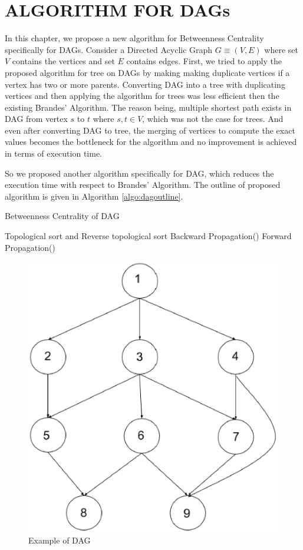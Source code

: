 \chapter{ALGORITHM FOR DAGs}
\label{chap:sup}
 
In this chapter, we propose a new algorithm for Betweenness Centrality specifically for DAGs. 
Consider a Directed Acyclic Graph $G \equiv (V,E)$ where set $V$ contains the vertices and set $E$ contains edges. 
First, we tried to apply the proposed algorithm for tree on DAGs by making making duplicate vertices if a vertex has two or more parents. Converting DAG into a tree with duplicating vertices and then applying the algorithm for trees was less efficient then the existing Brandes' Algorithm. The reason being, multiple shortest path exists in DAG from vertex $s$ to $t$ where $s, t \in V$, which was not the case for trees. And even after converting DAG to tree, the merging of vertices to compute the exact values becomes the bottleneck for the algorithm and no improvement is achieved in terms of execution time.   

So we proposed another algorithm specifically for DAG, which reduces the execution time with respect to Brandes' Algorithm. The outline of proposed algorithm is given in Algorithm \ref{algo:dagoutline}.
\vspace{1em}
\begin{algorithm}

\caption{Betweenness Centrality of DAG}
\label{algo:dagoutline}
Topological sort and Reverse topological sort\;
Backward Propagation()\;
Forward Propagation()\;
\end{algorithm}

\begin{figure}
\centering
\includegraphics[width=13cm]{images/exampledag.eps}
\caption{Example of DAG}
\label{fig:exdag}
\end{figure}

